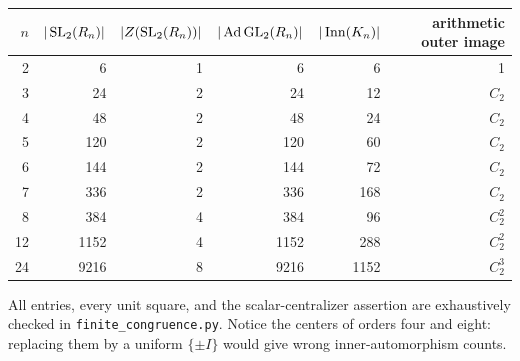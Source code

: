\begin{center}\small
\begin{tabular}{rrrrrr}
\toprule
$n$&$|\operatorname{SL}_2(R_n)|$&$|Z(\operatorname{SL}_2(R_n))|$&$|\operatorname{Ad}\operatorname{GL}_2(R_n)|$
 &$|\operatorname{Inn}(K_n)|$&arithmetic outer image\\
\midrule
2&6&1&6&6&1\\
3&24&2&24&12&$C_2$\\
4&48&2&48&24&$C_2$\\
5&120&2&120&60&$C_2$\\
6&144&2&144&72&$C_2$\\
7&336&2&336&168&$C_2$\\
8&384&4&384&96&$C_2^2$\\
12&1152&4&1152&288&$C_2^2$\\
24&9216&8&9216&1152&$C_2^3$\\
\bottomrule
\end{tabular}\end{center}
All entries, every unit square, and the scalar-centralizer assertion are
exhaustively checked in \nolinkurl{finite_congruence.py}. Notice the
centers of orders four and eight: replacing them by a uniform
$\{\pm I\}$ would give wrong inner-automorphism counts.

